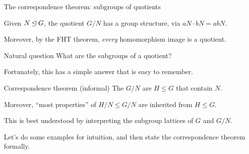 \documentclass[8pt, handout]{beamer}
\newcommand{\Pause}{}      %
\begin{document}
\begin{frame}{The correspondence theorem: subgroups of quotients}
  
  Given $N\unlhd G$, the quotient $G/N$ has a group structure, via
  $aN\cdot bN=abN$. \medskip\Pause
  
  Moreover, by the FHT theorem, \emph{every} homomorphism image is a
  quotient. \smallskip\Pause
  
  \begin{exampleblock}{Natural question}
    What are the subgroups of a quotient?
  \end{exampleblock}
  
  \smallskip\Pause
  
  Fortunately, this has a simple answer that is easy to remember.
  
  \smallskip\Pause
  
  \begin{alertblock}{Correspondence theorem (informal)}
    The  $G/N$ are  $H\leq G$ that contain $N$. \medskip\Pause
    
    Moreover, ``most properties'' of $H/N\leq G/N$ are inherited from $H\leq G$.
  \end{alertblock}
  
  \smallskip\Pause
  
  This is best understood by interpreting the subgroup lattices of $G$
  and $G/N$.
  
  \medskip\Pause
  
  Let's do some examples for intuition, and then state the
  correspondence theorem formally.
  
\end{frame}

\end{document}
